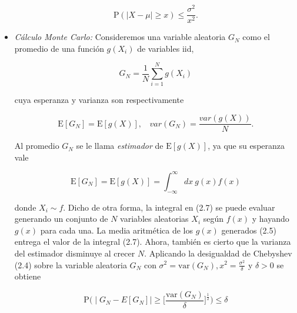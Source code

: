 \begin{itemize}
    \begin{equation}
        \text{P}(\mid X - \mu \mid \geq x) \leq \dfrac{\sigma^2}{x^2}.
    \end{equation}
    
    \citep{dekking2005}
    
    \item \textit{Cálculo Monte Carlo:}
    \newline
    Consideremos una variable aleatoria $G_N$ como el promedio de una función $g(X_i)$ de variables iid,
    
    \begin{equation}
        G_N = \dfrac{1}{N} \sum_{i = 1}^{N} g(X_i)
    \end{equation}
    
    cuya esperanza y varianza son respectivamente
    
    \begin{equation}
        \text{E}[G_N] = \text{E}[g(X)], ~~~~ var(G_N) = \dfrac{var(g(X))}{N}.
    \end{equation}
    
    \citep{kalos2008}
    
    Al promedio $G_N$ se le llama \textit{estimador} de $\text{E}[g(X)]$, ya que su esperanza vale
    
    \begin{equation}
        \text{E}[G_N] = \text{E}[g(X)] = \int_{-\infty}^{\infty} dx ~ g(x) f(x)
    \end{equation}
    
    donde $X_i \sim f$.
    \newline \newline
    Dicho de otra forma, la integral en (2.7) se puede evaluar generando un conjunto de $N$ variables aleatorias $X_i$ según $f(x)$ y hayando $g(x)$ para cada una. La media aritmética de los $g(x)$ generados (2.5) entrega el valor de la integral (2.7). Ahora, también es cierto que la varianza del estimador disminuye al crecer $N$.
    \newline \newline
    Aplicando la desigualdad de Chebyshev (2.4) sobre la variable aleatoria $G_N$ con $\sigma^2 = \text{var}(G_N), x^2 = \frac{\sigma^2}{\delta}$ y $\delta > 0$ se obtiene
    
    \begin{equation}
        \text{P}\Bigg( \mid G_N - E[G_N] \mid \geq \bigg[ \dfrac{\text{var}(G_N)}{\delta} \bigg] ^{\frac{1}{2}} \Bigg) \leq \delta
    \end{equation}
    

\end{itemize}
